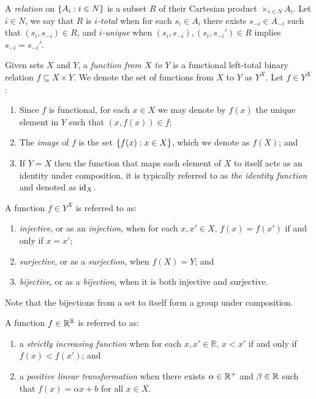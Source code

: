 	A \textit{relation} on $\left\{A_i: i \in N\right\}$ is a subset $R$ of their Cartesian product $\times_{i \in N}A_i$. Let $i \in N$, we say that $R$ is \textit{$i$-total} when for each $s_i \in A_i$ there exists $s_{-i} \in A_{-i}$ such that $(s_i, s_{-i}) \in R$, and \textit{$i$-unique} when $(s_i, s_{-i}), (s_i, s_{-i}') \in R$ implies $s_{-i} = s_{-i}'$.
	
	Given sets $X$ and $Y$, a \textit{function from $X$ to $Y$} is a functional left-total binary relation $f \subseteq X\times{Y}$. We denote the set of functions from $X$ to $Y$ as $Y^X$. Let $f \in Y^X$:
	\begin{enumerate}
		\item Since $f$ is functional, for each $x \in X$ we may denote by $f(x)$ the unique element in $Y$ such that $(x, f(x)) \in f$;
		\item The \textit{image} of $f$ is the set $\left\{f(x): x \in X\right\}$, which we denote as $f(X)$; and
		\item If $Y=X$ then the function that maps each element of $X$ to itself acts as an identity under composition, it is typically referred to as \textit{the identity function} and denoted as $\text{id}_X$. 
	\end{enumerate}
	
	A function $f \in Y^X$ is referred to as:
	\begin{enumerate}
		\item \textit{injective}, or as an \textit{injection}, when for each $x, x' \in X$, $f(x) = f(x')$ if and only if $x = x'$;
		\item \textit{surjective}, or as a \textit{surjection}, when $f(X) = Y$; and
		\item \textit{bijective}, or as a \textit{bijection}, when it is both injective and surjective. 
	\end{enumerate}
	
	Note that the bijections from a set to itself form a group under composition.
	
	A function $f \in \mathbb{R}^{\mathbb{R}}$ is referred to as:
	\begin{enumerate}
		\item a \textit{strictly increasing function} when for each $x, x' \in \mathbb{R}$, $x < x'$ if and only if $f(x) < f(x')$; and
		\item a \textit{positive linear transformation} when there exists $\alpha \in \mathbb{R}^+$ and $\beta \in \mathbb{R}$ such that $f(x) = \alpha{x} + b$ for all $x \in X$.
	\end{enumerate}
	
